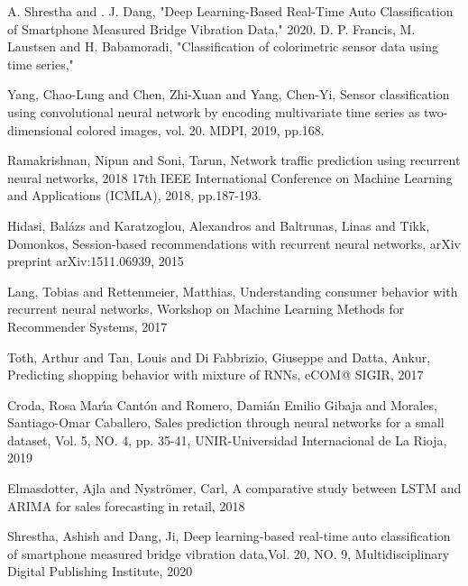 \documentclass[conference]{IEEEtran}
\begin{document}
\begin{thebibliography}{00}
 A. Shrestha and . J. Dang, "Deep Learning-Based Real-Time Auto Classification of Smartphone Measured Bridge Vibration Data," 2020. 
 D. P. Francis, M. Laustsen and H. Babamoradi, "Classification of colorimetric sensor data using time series," 

 Yang, Chao-Lung and Chen, Zhi-Xuan and Yang, Chen-Yi, Sensor classification using convolutional neural network by encoding multivariate time series as two-dimensional colored images, vol. 20. MDPI, 2019, pp.168.

 Ramakrishnan, Nipun and Soni, Tarun, Network traffic prediction using recurrent neural networks, 2018 17th IEEE International Conference on Machine Learning and Applications (ICMLA), 2018, pp.187-193.

 Hidasi, Bal{\'a}zs and Karatzoglou, Alexandros and Baltrunas, Linas and Tikk, Domonkos, Session-based recommendations with recurrent neural networks, arXiv preprint arXiv:1511.06939, 2015

 Lang, Tobias and Rettenmeier, Matthias, Understanding consumer behavior with recurrent neural networks, Workshop on Machine Learning Methods for Recommender Systems, 2017
 
 Toth, Arthur and Tan, Louis and Di Fabbrizio, Giuseppe and Datta, Ankur, Predicting shopping behavior with mixture of RNNs, eCOM@ SIGIR, 2017

 Croda, Rosa Mar{\'\i}a Cant{\'o}n and Romero, Dami{\'a}n Emilio Gibaja and Morales, Santiago-Omar Caballero, Sales prediction through neural networks for a small dataset, Vol. 5, NO. 4, pp. 35-41, UNIR-Universidad Internacional de La Rioja, 2019

 Elmasdotter, Ajla and Nystr{\"o}mer, Carl, A comparative study between LSTM and ARIMA for sales forecasting in retail, 2018

 Shrestha, Ashish and Dang, Ji, Deep learning-based real-time auto classification of smartphone measured bridge vibration data,Vol. 20, NO. 9, Multidisciplinary Digital Publishing Institute, 2020

\end{thebibliography}
\end{document}
